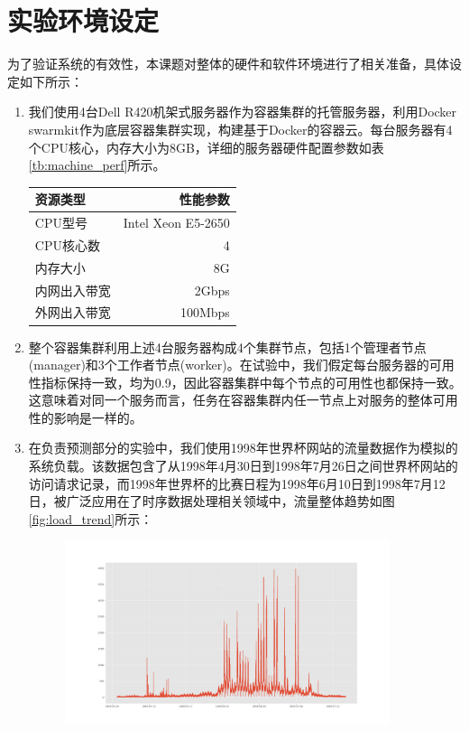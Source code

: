 \section{实验环境设定}\label{sec:env_prep}
为了验证系统的有效性，本课题对整体的硬件和软件环境进行了相关准备，具体设定如下所示：
\begin{enumerate}
\item 我们使用4台Dell R420机架式服务器作为容器集群的托管服务器，利用Docker swarmkit作为底层容器集群实现，构建基于Docker的容器云。每台服务器有4个CPU核心，内存大小为8GB，详细的服务器硬件配置参数如表\ref{tb:machine_perf}所示。

\begin{table}[h]
\centering
{}
\begin{tabular}{@{}lr@{}} \toprule
 资源类型 & 性能参数 \\ \midrule
 CPU型号 & Intel Xeon E5-2650\\
 CPU核心数 & 4\\
 内存大小 & 8G\\
 内网出入带宽 & 2Gbps\\
 外网出入带宽 & 100Mbps\\ \bottomrule
\end{tabular}
\end{table}

\item 整个容器集群利用上述4台服务器构成4个集群节点，包括1个管理者节点(manager)和3个工作者节点(worker)。在试验中，我们假定每台服务器的可用性指标保持一致，均为0.9，因此容器集群中每个节点的可用性也都保持一致。这意味着对同一个服务而言，任务在容器集群内任一节点上对服务的整体可用性的影响是一样的。

\item 在负责预测部分的实验中，我们使用1998年世界杯网站的流量数据作为模拟的系统负载。该数据包含了从1998年4月30日到1998年7月26日之间世界杯网站的访问请求记录，而1998年世界杯的比赛日程为1998年6月10日到1998年7月12日，被广泛应用在了时序数据处理相关领域中，流量整体趋势如图\ref{fig:load_trend}所示：
\begin{figure}[htbp]
\centering
\includegraphics[width=0.9\textwidth]{./figure/alldata}
\end{figure}


\end{enumerate}
